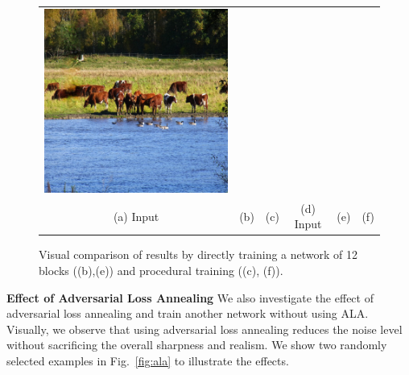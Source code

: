 \begin{figure}[h!]
\begin{tabular}{cccccc}
\includegraphics[width=.16\textwidth]{figures/proc/000000314034_synthesized_image.jpg}\\
(a) Input & (b)  & (c)  & (d) Input & (e)  & (f)  \\
\end{tabular}
\caption{Visual comparison of results by directly training a network of 12 blocks ((b),(e)) and procedural training ((c), (f)).}
\label{fig:proc}
\vspace{-10pt}
\end{figure}  

\noindent\textbf{Effect of Adversarial Loss Annealing} We also investigate the effect of adversarial loss annealing and train another network without using ALA. Visually, we observe that using adversarial loss annealing reduces the noise level without sacrificing the overall sharpness and realism. We show two randomly selected examples in Fig.~\ref{fig:ala} to illustrate the effects. 

